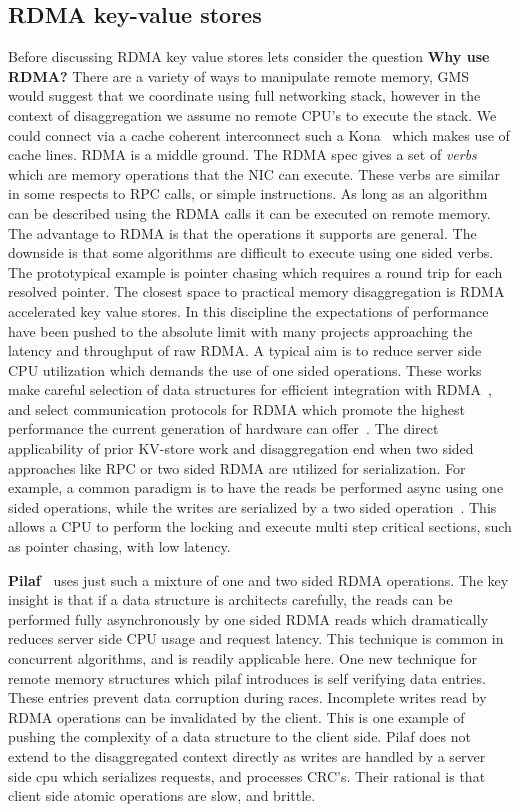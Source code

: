 \subsection{RDMA key-value stores} 
Before discussing RDMA key value stores lets consider the question \textbf{Why
use RDMA?} There are a variety of ways to manipulate remote memory,
GMS~\cite{gms} would suggest that we coordinate using full networking stack,
however in the context of disaggregation we assume no remote CPU's to execute
the stack. We could connect via a cache coherent interconnect such a
Kona~\cite{kona} which makes use of cache lines. RDMA is a middle ground. The
RDMA spec gives a set of \textit{verbs} which are memory operations that the NIC
can execute. These verbs are similar in some respects to RPC calls, or simple
instructions. As long as an algorithm can be described using the RDMA calls it
can be executed on remote memory. The advantage to RDMA is that the operations
it supports are general. The downside is that some algorithms are difficult to
execute using one sided verbs. The prototypical example is pointer chasing which
requires a round trip for each resolved pointer.
The closest space to practical memory disaggregation is RDMA accelerated key
value stores. In this discipline the expectations of performance have been
pushed to the absolute limit with many projects approaching the latency and
throughput of raw RDMA. A typical aim is to reduce server side CPU utilization
which demands the use of one sided operations. These works make careful
selection of data structures for efficient integration with
RDMA~\cite{hopscotch,cuckoo}, and select communication protocols for RDMA which
promote the highest performance the current generation of hardware can
offer~\cite{herd,storm}. The direct applicability of prior KV-store work and
disaggregation end when two sided approaches like RPC or two sided RDMA are
utilized for serialization. For example, a common paradigm is to have the reads
be performed async using one sided operations, while the writes are serialized
by a two sided operation~\cite{pilaf}. This allows a CPU to perform the locking
and execute multi step critical sections, such as pointer chasing, with low
latency.

\textbf{Pilaf~\cite{pilaf}} uses just such a mixture of one and two sided RDMA
operations. The key insight is that if a data structure is architects carefully,
the reads can be performed fully asynchronously by one sided RDMA reads which
dramatically reduces server side CPU usage and request latency. This technique
is common in concurrent algorithms, and is readily applicable here. One new
technique for remote memory structures which pilaf introduces is self verifying
data entries. These entries prevent data corruption during races. Incomplete
writes read by RDMA operations can be invalidated by the client. This is one
example of pushing the complexity of a data structure to the client side. Pilaf
does not extend to the disaggregated context directly as writes are handled by a
server side cpu which serializes requests, and processes CRC's. Their rational
is that client side atomic operations are slow, and brittle. 


